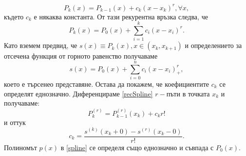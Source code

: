 \documentclass[12pt]{article}
\numberwithin{equation}{subsection}
\numberwithin{theorem}{subsection}
\numberwithin{definition}{subsection}
\numberwithin{corollary}{subsection}
\begin{document}
  \begin{equation}\label{recSpline}
    P_k(x)=P_{k-1}(x)+c_k(x-x_k)^r, \forall x,
  \end{equation}
  където $c_k$ е някаква константа. От тази рекурентна връзка следва, че 
  \begin{equation*}
    P_k(x)=P_0(x)+\sum_{i=1}^{k}c_i(x-x_i)^r.
  \end{equation*}
  Като вземем предвид, че $s(x)\equiv P_k(x), x\in(x_k,x_{k+1})$ и определението за отсечена функция от горното равенство получаваме
  \begin{equation*}
    s(x)=P_0(x)+\sum_{i=0}^{n}c_i(x-x_i)_+^r,
  \end{equation*}
  което е търсенео представяне. Остава да покажем, че коефициентите $c_k$ се определят еднозначно.
  Диференцираме \ref{recSpline} $r-$пъти в точката $x_k$ и получаваме:
  \begin{equation*}
    P^{(r)}_k=P_{k-1}^{(r)}(x_k)+c_kr!
  \end{equation*}
  и оттук
  \begin{equation*}
    c_k=\frac{s^{(k)}(x_k+0)-s^{(r)}(x_k-0)}{r!}.
  \end{equation*}
  Полиномът $p(x)$ в \ref{spline} се определя също еднозначно и съвпада с $P_0(x).$
\end{document}
